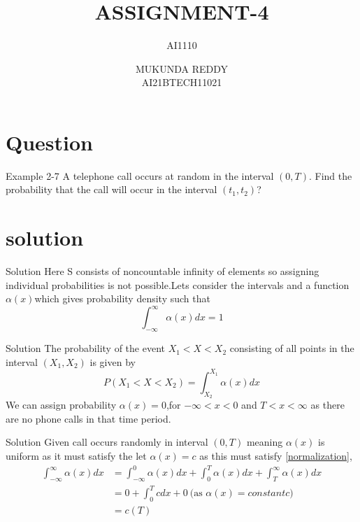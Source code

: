 \documentclass{beamer}
\title[AI1110  Assignment-4]{ASSIGNMENT-4}
\subtitle{AI1110}
\author[]{MUKUNDA REDDY \\ AI21BTECH11021}
\date{}
\begin{document}
 
  \begin{frame}
      \titlepage
  \end{frame}
  
  \begin{frame}
      \tableofcontents
  \end{frame}
  
  \section{Question}
   \begin{frame}{Example 2-7}
   A telephone call occurs at random in the interval $(0, T)$.
   Find the probability that the call will occur in the interval
   $(t_1,t_2)$?
    \end{frame}
    
    \section{solution}
    \begin{frame}{Solution}
        Here S consists of noncountable infinity of elements so assigning individual probabilities is not possible.Lets consider the intervals and a function
        $\alpha(x)$\;which gives probability density such that\\
    \begin{equation}
    \label{normalization}
        \int_{-\infty}^{\infty} \alpha(x) dx = 1
    \end{equation}
    
    \end{frame}
    
    \begin{frame}{Solution}
    The probability of the event ${X_1 < X < X_2}$
    consisting of all points in the interval $(X_1, X_2)$
    is given by \\
    \begin{equation}
    \label{intervalprob}
        P(X_1<X<X_2) =  \int_{X_2}^{X_1} \alpha(x)dx 
    \end{equation}
    We can assign probability $\alpha(x) = 0$,for $-\infty<x<0$ and $T<x<\infty$ as there are no phone calls in that time period. \\
    \end{frame}
    
    \begin{frame}{Solution}
    Given call occurs randomly in interval $(0,T)$ meaning
    $\alpha(x)$ is uniform as it must satisfy the  let $\alpha(x) = c$ as this must satisfy \eqref{normalization},
    \begin{align*}
        \int_{-\infty}^{\infty} \alpha(x) dx &= \int_{-\infty}^{0} \alpha(x) dx  +\int_{0}^{T} \alpha(x) dx  +\int_{T}^{\infty} \alpha(x) dx \\
          &= 0+\int_{0}^{T} c dx +0 \: \text{(as $\alpha(x) =constant c$)} \\
          &= c(T) \\
    \end{align*}
    
    
    \end{frame}
    
\end{document}
